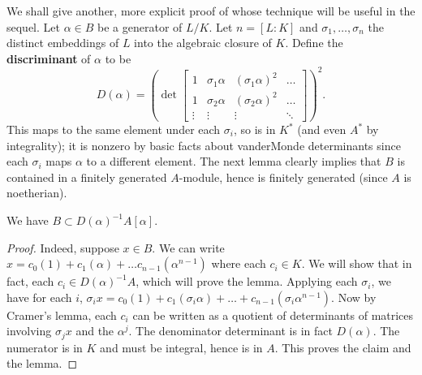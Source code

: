 We shall give another, more explicit proof of  whose technique will be useful in the sequel.
Let $\alpha  \in B$ be a generator of $L/K$.  Let $n=[L:K]$ and $\sigma_1, \dots, \sigma_n$ the distinct embeddings of $L$ into the algebraic closure of $K$.
Define the \textbf{discriminant} of $\alpha$ to be
\[ D(\alpha) = \left(\det \begin{bmatrix} 
1 & \sigma_1\alpha & (\sigma_1 \alpha)^2 & \dots \\
1 & \sigma_2\alpha & (\sigma_2 \alpha)^2 & \dots \\
\vdots & \vdots & \vdots & \ddots \end{bmatrix}\right)^2 .\]
This maps to the same element under each $\sigma_i$, so is in $K^*$ (and even
$A^*$ by integrality); it is nonzero by basic facts about vanderMonde
determinants since each $\sigma_i$ maps $\alpha$ to a different element.  The  next lemma clearly implies that $B$ is contained in a finitely generated $A$-module, hence is finitely generated (since $A$ is noetherian).
\begin{lemma} We have $B \subset D(\alpha)^{-1} A[\alpha]$. 
\end{lemma}
\begin{proof}
Indeed, suppose $x \in B$.  We can write $x = c_0 (1) + c_1 (\alpha) + \dots c_{n-1}(\alpha^{n-1})$ where each $c_i \in K$.  We will show that in fact, each $c_i \in D(\alpha)^{-1}A$, which will prove the lemma.  Applying each $\sigma_i$, we have for each $i$, $\sigma_i x = c_0 (1) + c_1 (\sigma_i \alpha) + \dots + c_{n-1} ( \sigma_i \alpha^{n-1})$.
Now by Cramer's lemma, each $c_i$ can be written as a quotient of determinants of matrices involving $\sigma_jx $ and the $\alpha^{j}$.  The denominator determinant is in fact $D(\alpha)$.  The numerator is in $K$ and must be integral, hence is in $A$.  This proves the claim and the lemma.
\end{proof}

